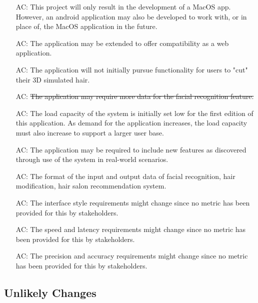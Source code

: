 \documentclass[12pt, titlepage]{article}
\newcounter{acnum}
\begin{document}
\noindent \begin{itemize}

\item[AC\refstepcounter{acnum}\theacnum\label{LC_meaningfulLabel}:] 
This project will only result in the development of a MacOS app. However, an android application may also be developed to work with, or in place of, the MacOS application in the future.
\item[AC\refstepcounter{acnum}\theacnum\label{LC_meaningfulLabel}:] 
The application may be extended to offer compatibility as a web application.
\item[AC\refstepcounter{acnum}\theacnum\label{LC_meaningfulLabel}:] 
The application will not initially pursue functionality for users to "cut" their 3D simulated hair.
\item[AC\refstepcounter{acnum}\theacnum\label{LC_meaningfulLabel}:] 
\sout{The application may require more data for the facial recognition feature.}
\item[AC\refstepcounter{acnum}\theacnum\label{LC_meaningfulLabel}:] 
The load capacity of the system is initially set low for the first edition of this application. As demand for the application increases, the load capacity must also increase to support a larger user base.
\item[AC\refstepcounter{acnum}\theacnum\label{LC_meaningfulLabel}:] 
The application may be required to include new features as discovered through use of the system in real-world scenarios.
\item[AC\refstepcounter{acnum}\theacnum\label{LC_meaningfulLabel}:] 
The format of the
input and output data of facial recognition, hair modification, hair salon recommendation system.
\item[AC\refstepcounter{acnum}\theacnum\label{LC_meaningfulLabel}:] 
The interface style requirements might change since no metric has been provided for this by stakeholders. 
\item[AC\refstepcounter{acnum}\theacnum\label{LC_meaningfulLabel}:] 
The speed and latency requirements might change since no metric has been provided for this by stakeholders. 
\item[AC\refstepcounter{acnum}\theacnum\label{LC_meaningfulLabel}:] 
The precision and accuracy requirements might change since no metric has been provided for this by stakeholders. 


\end{itemize}

\subsection{Unlikely Changes} \label{SecUchange}
\end{document}
